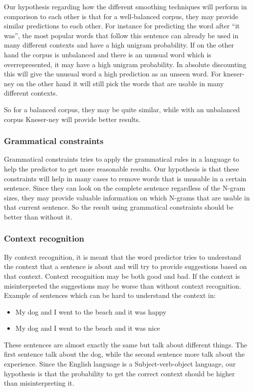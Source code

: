 Our hypothesis regarding how the different smoothing techniques will perform in comparison to each other is that for a well-balanced corpus, they may provide similar predictions to each other. For instance for predicting the word after “it was”, the most popular words that follow this sentence can already be used in many different contexts and have a high unigram probability. If on the other hand the corpus is unbalanced and there is an unusual word which is overrepresented, it may have a high unigram probability. In absolute discounting this will give the unusual word a high prediction as an unseen word. For kneser-ney on the other hand it will still pick the words that are usable in many different contexts.

So for a balanced corpus, they may be quite similar, while with an unbalanced corpus Kneser-ney will provide better results.
\subsubsection{Grammatical constraints}
Grammatical constraints tries to apply the grammatical rules in a language to help the predictor to get more reasonable results. Our hypothesis is that these constraints will help in many cases to remove words that is unusable in a certain sentence. Since they can look on the complete sentence regardless of the N-gram sizes, they may provide valuable information on which N-grams that are usable in that current sentence. So the result using grammatical constraints should be better than without it.
\subsubsection{Context recognition}
By context recognition, it is meant that the word predictor tries to understand the context that a sentence is about and will try to provide suggestions based on that context. Context recognition may be both good and bad. If the context is misinterpreted the suggestions may be worse than without context recognition. Example of sentences which can be hard to understand the context in:

\begin{itemize}
\item My dog and I went to the beach and it was happy
\item My dog and I went to the beach and it was nice
\end{itemize}
These sentences are almost exactly the same but talk about different things. The first sentence talk about the dog, while the second sentence more talk about the experience.
Since the English language is a Subject-verb-object language, our hypothesis is that the probability to get the correct context should be higher than misinterpreting it.

